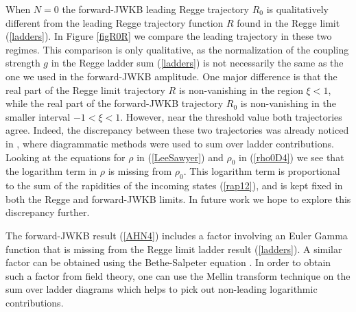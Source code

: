 When $N = 0$ the forward-JWKB leading Regge trajectory $R_{0}$ is qualitatively different from the leading Regge trajectory function $R$ found in the Regge limit (\ref{ladders}). In Figure \ref{figR0R} we compare the leading trajectory in these two regimes. This comparison is only qualitative, as the normalization of the coupling strength $g$ in the Regge ladder sum (\ref{ladders}) is not necessarily the same as the one we used in the forward-JWKB amplitude. One major difference is that the real part of the Regge limit trajectory $R$ is non-vanishing in the region $\xi < 1$, while the real part of the forward-JWKB trajectory $R_{0}$ is non-vanishing in the smaller interval $-1 < \xi < 1$. However, near the threshold value both trajectories agree. Indeed, the discrepancy between these two trajectories was already noticed in \cite{Levy:1970yn}, where diagrammatic methods were used to sum over ladder contributions. Looking at the equations for $\rho$ in (\ref{LeeSawyer}) and $\rho_{0}$ in (\ref{rho0D4}) we see that the logarithm term in $\rho$ is missing from $\rho_{0}$. This logarithm term is proportional to the sum of the rapidities of the incoming states (\ref{rap12}), and is kept fixed in both the Regge and forward-JWKB limits. In future work we hope to explore this discrepancy further.

The forward-JWKB result (\ref{AHN4}) includes a factor involving an Euler Gamma function that is missing from the Regge limit ladder result (\ref{ladders}). A similar factor can be obtained using the Bethe-Salpeter equation \cite{LeeSawyer}. In order to obtain such a factor from field theory, one can use the Mellin transform technique \cite{BjorkenWu,TruemanYao} on the sum over ladder diagrams \cite{Polkinghorne1,Polkinghorne2,SMatrixBook} which helps to pick out non-leading logarithmic contributions.

